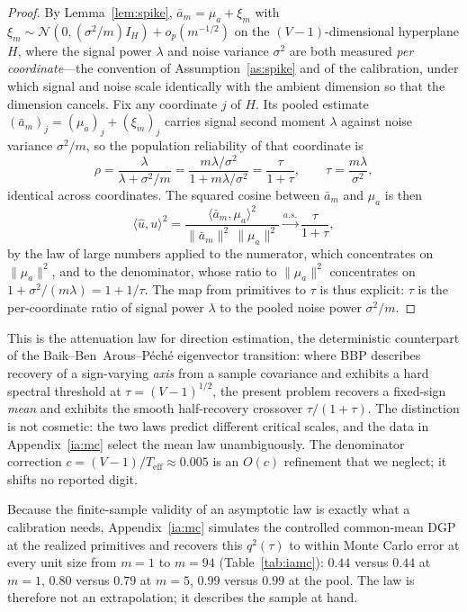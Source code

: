 \documentclass[12pt]{article}
\theoremstyle{plain}
\theoremstyle{definition}
\begin{document}
\begin{proof}
By Lemma~\ref{lem:spike}, $\bar a_m=\mu_a+\xi_m$ with
$\xi_m\sim\mathcal N(0,(\sigma^2/m)I_H)+o_p(m^{-1/2})$ on the
$(V-1)$-dimensional hyperplane $H$, where the signal power $\lambda$ and noise
variance $\sigma^2$ are both measured \emph{per coordinate}---the convention of
Assumption~\ref{as:spike} and of the calibration, under which signal and noise
scale identically with the ambient dimension so that the dimension cancels. Fix
any coordinate $j$ of $H$. Its pooled estimate $(\bar a_m)_j=(\mu_a)_j+(\xi_m)_j$
carries signal second moment $\lambda$ against noise variance $\sigma^2/m$, so
the population reliability of that coordinate is
\[
\rho=\frac{\lambda}{\lambda+\sigma^2/m}=\frac{m\lambda/\sigma^2}{1+m\lambda/\sigma^2}
=\frac{\tau}{1+\tau},\qquad \tau=\frac{m\lambda}{\sigma^2},
\]
identical across coordinates. The squared cosine between $\bar a_m$ and $\mu_a$
is then
\[
\langle\hat u,u\rangle^2
=\frac{\langle\bar a_m,\mu_a\rangle^2}{\|\bar a_m\|^2\,\|\mu_a\|^2}
\xrightarrow{a.s.}\frac{\tau}{1+\tau},
\]
by the law of large numbers applied to the numerator, which concentrates on
$\|\mu_a\|^2$, and to the denominator, whose ratio to $\|\mu_a\|^2$ concentrates
on $1+\sigma^2/(m\lambda)=1+1/\tau$. The map from primitives to $\tau$ is thus
explicit: $\tau$ is the per-coordinate ratio of signal power $\lambda$ to the
pooled noise power $\sigma^2/m$.
\qedhere
\end{proof}

\noindent This is the attenuation law for direction estimation, the deterministic
counterpart of the Baik--Ben~Arous--P\'ech\'e eigenvector transition: where BBP
describes recovery of a sign-varying \emph{axis} from a sample covariance and
exhibits a hard spectral threshold at $\tau=(V-1)^{1/2}$, the present problem
recovers a fixed-sign \emph{mean} and exhibits the smooth half-recovery crossover
$\tau/(1+\tau)$. The distinction is not cosmetic: the two laws predict different
critical scales, and the data in Appendix~\ref{ia:mc} select the mean law
unambiguously. The denominator correction $c=(V-1)/T_{\text{eff}}\approx0.005$ is
an $O(c)$ refinement that we neglect; it shifts no reported digit.

Because the finite-sample validity of an asymptotic law is exactly what a
calibration needs, Appendix~\ref{ia:mc} simulates the controlled common-mean DGP
at the realized primitives and recovers this $q^2(\tau)$ to within Monte Carlo
error at every unit size from $m=1$ to $m=94$ (Table~\ref{tab:iamc}): $0.44$
versus $0.44$ at $m=1$, $0.80$ versus $0.79$ at $m=5$, $0.99$ versus $0.99$ at the
pool. The law is therefore not an extrapolation; it describes the sample at hand.
\end{document}

